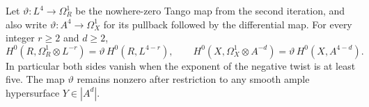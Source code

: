 \begin{lemma}
\label{lem:OC-threefold-differential-degrees}
Let $\vartheta:L^4\to\Omega_R^1$ be the nowhere-zero Tango map from the second iteration, and also write $\vartheta:A^4\to\Omega_X^1$ for its pullback followed by the differential map.  For every integer $r\geq2$ and $d\geq2$,
\[
 H^0(R,\Omega_R^1\otimes L^{-r})
          =\vartheta\,H^0(R,L^{4-r}),
 \qquad
 H^0(X,\Omega_X^1\otimes A^{-d})
          =\vartheta\,H^0(X,A^{4-d}).
\]
In particular both sides vanish when the exponent of the negative twist is at least five.  The map $\vartheta$ remains nonzero after restriction to any smooth ample hypersurface $Y\in|A^d|$.
\end{lemma}
